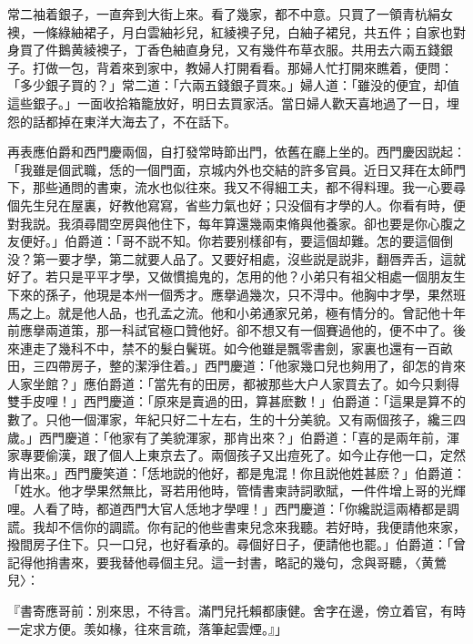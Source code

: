 常二袖着銀子，一直奔到大街上來。看了幾家，都不中意。只買了一領青杭絹女襖，一條綠紬裙子，月白雲紬衫兒，紅綾襖子兒，白紬子裙兒，共五件；自家也對身買了件鵝黄綾襖子，丁香色紬直身兒，又有幾件布草衣服。共用去六兩五錢銀子。打做一包，背着來到家中，教婦人打開看看。那婦人忙打開來瞧着，便問：「多少銀子買的？」常二道：「六兩五錢銀子買來。」婦人道：「雖没的便宜，却值這些銀子。」一面收拾箱籠放好，明日去買家活。當日婦人歡天喜地過了一日，埋怨的話都掉在東洋大海去了，不在話下。

再表應伯爵和西門慶兩個，自打發常時節出門，依舊在廳上坐的。西門慶因説起：「我雖是個武職，恁的一個門面，京城内外也交結的許多官員。近日又拜在太師門下，那些通問的書柬，流水也似往來。我又不得細工夫，都不得料理。我一心要尋個先生兒在屋裏，好教他寫寫，省些力氣也好；只没個有才學的人。你看有時，便對我説。我須尋間空房與他住下，每年算還幾兩束脩與他養家。卻也要是你心腹之友便好。」伯爵道：「哥不説不知。你若要别樣卻有，要這個却難。怎的要這個倒没？第一要才學，第二就要人品了。又要好相處，沒些説是説非，翻唇弄舌，這就好了。若只是平平才學，又做慣搗鬼的，怎用的他？小弟只有祖父相處一個朋友生下來的孫子，他現是本州一個秀才。應擧過幾次，只不淂中。他胸中才學，果然班馬之上。就是他人品，也孔孟之流。他和小弟通家兄弟，極有情分的。曾記他十年前應擧兩道策，那一科試官極口贊他好。卻不想又有一個賽過他的，便不中了。後來連走了幾科不中，禁不的髮白鬢斑。如今他雖是飄零書劍，家裏也還有一百畝田，三四帶房子，整的潔淨住着。」西門慶道：「他家幾口兒也夠用了，卻怎的肯來人家坐館？」應伯爵道：「當先有的田房，都被那些大户人家買去了。如今只剩得雙手皮哩！」西門慶道：「原來是賣過的田，算甚麽數！」伯爵道：「這果是算不的數了。只他一個渾家，年紀只好二十左右，生的十分美貌。又有兩個孩子，纔三四歲。」西門慶道：「他家有了美貌渾家，那肯出來？」伯爵道：「喜的是兩年前，渾家專要偷漢，跟了個人上東京去了。兩個孩子又出痘死了。如今止存他一口，定然肯出來。」西門慶笑道：「恁地説的他好，都是鬼混！你且説他姓甚麽？」伯爵道：「姓水。他才學果然無比，哥若用他時，管情書柬詩詞歌賦，一件件增上哥的光輝哩。人看了時，都道西門大官人恁地才學哩！」西門慶道：「你纔説這兩樁都是調謊。我却不信你的調謊。你有記的他些書柬兒念來我聽。若好時，我便請他來家，撥間房子住下。只一口兒，也好看承的。尋個好日子，便請他也罷。」伯爵道：「曾記得他捎書來，要我替他尋個主兒。這一封書，略記的幾句，念與哥聽，〈黄鶯兒〉：

『書寄應哥前：別來思，不待言。滿門兒托賴都康健。舍字在邊，傍立着官，有時一定求方便。羡如椽，往來言疏，落筆起雲煙。』」

